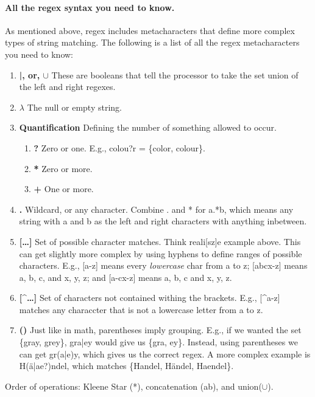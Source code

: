 \documentclass[10pt]{article}
\begin{document}
\paragraph{All the regex syntax you need to know.}
As mentioned above, regex includes metacharacters that define more complex types
of string matching.
The following is a list of all the regex metacharacters you need to know:
\begin{enumerate}
\item \textbf{|, or, $\cup$}
These are booleans that tell the processor to take the set union of the left
and right regexes.
\item \textbf{$\lambda$}
The null or empty string.
\item \textbf{Quantification}
Defining the number of something allowed to occur.
    \begin{enumerate}
    \item \textbf{?}
    Zero or one.
    E.g., colou?r = \{color, colour\}.
    \item \textbf{*}
    Zero or more.
    \item \textbf{+}
    One or more.
    \end{enumerate}
\item \textbf{.}
Wildcard, or any character.
Combine . and * for a.*b, which means any string with a and b as the left and right
characters with anything inbetween.
\item \textbf{[\ldots]}
Set of possible character matches.
Think reali[sz]e example above.
This can get slightly more complex by using hyphens to define ranges of possible characters.
E.g., [a-z] means every \textit{lowercase} char from a to z;
[abcx-z] means a, b, c, and x, y, z; and [a-cx-z] means a, b, c and x, y, z.
\item \textbf{[\string^\ldots]}
Set of characters not contained withing the brackets.
E.g., [\string^a-z] matches any characcter that is not a lowercase letter from a to z.
\item \textbf{()}
Just like in math, parentheses imply grouping.
E.g., if we wanted the set \{gray, grey\}, gra|ey would give us \{gra, ey\}.
Instead, using parentheses we can get gr(a|e)y, which gives us the correct regex.
A more complex example is H(\"{a}|ae?)ndel, which matches \{Handel, H\"{a}ndel, Haendel\}.
\end{enumerate}

Order of operations: Kleene Star (*), concatenation (ab), and union($\cup$).
\end{document}
